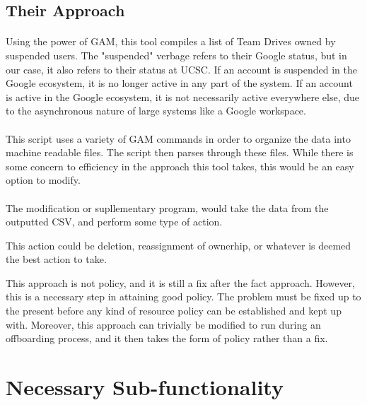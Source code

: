 \documentclass{article}
\begin{document}
\subsection*{Their Approach}
\begin{tcolorbox}
    \paragraph{}Using the power of GAM, this tool compiles a list of Team Drives owned by suspended users.
    The "suspended" verbage refers to their Google status, but in our case, it also refers to their
    status at UCSC. If an account is suspended in the Google ecosystem, it is no longer active in any part of the system.
    If an account is active in the Google ecosystem, it is not necessarily active everywhere else, due to the asynchronous nature of
    large systems like a Google workspace.

        
    \paragraph{}This script uses a variety of GAM commands in order to organize the data into
    machine readable files. The script then parses through these files. While there is some concern to efficiency in the approach this tool takes,
    this would be an easy option to modify.

    \paragraph{}The modification or supllementary program, would take the data from the outputted CSV, and perform some type of action.

    This action could be deletion, reassignment of ownerhip, or whatever is deemed the best action to take.
\end{tcolorbox}

This approach is not policy, and it is still a fix after the fact approach.
However, this is a necessary step in attaining good policy. The problem must be fixed up to the present before any kind of resource policy
can be established and kept up with. Moreover, this approach can trivially be modified to run during an offboarding process, and it then takes the form of policy rather than a fix.



\newpage
\section{Necessary Sub-functionality}
\end{document}
